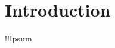\documentclass[10pt,twoside,reqno]{article}
\begin{document}
\vspace*{12pt}

\setlength{\parskip}{0ex}

\pagestyle{fancy}
\setcounter{footnote}{\autorzahl}


\newpage %
\section{Introduction}\label{Introduction} %

!!Ipsum







\end{document}
